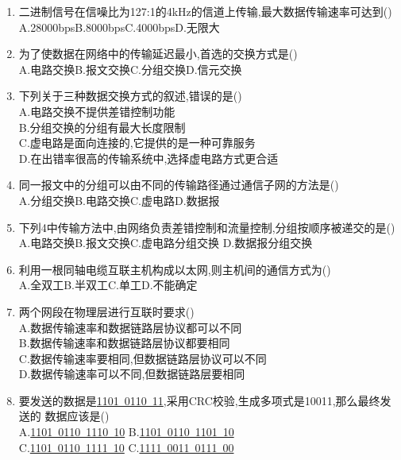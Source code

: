 \documentclass[12pt, a4paper, oneside, UTF8]{ctexbook}
\begin{document}
\begin{enumerate}
    \item \bl[1] 二进制信号在信噪比为127:1的4kHz的信道上传输,最大数据传输速率可达到() \\
    A.28000bps\qquad B.8000bps\qquad C.4000bps\qquad D.无限大

    \item 为了使数据在网络中的传输延迟最小,首选的交换方式是() \\
    A.电路交换\qquad B.报文交换\qquad C.分组交换\qquad D.信元交换 
    
    \item 下列关于三种数据交换方式的叙述,错误的是() \\
    A.电路交换不提供差错控制功能 \\
    B.分组交换的分组有最大长度限制 \\
    C.虚电路是面向连接的,它提供的是一种可靠服务 \\
    D.在出错率很高的传输系统中,选择虚电路方式更合适 

    \item 同一报文中的分组可以由不同的传输路径通过通信子网的方法是()  \\
    A.分组交换\qquad B.电路交换\qquad C.虚电路\qquad D.数据报

    \item 下列4中传输方法中,由网络负责差错控制和流量控制,分组按顺序被递交的是() \\
    A.电路交换\qquad B.报文交换\qquad C.虚电路分组交换 \qquad D.数据报分组交换 

    \item 利用一根同轴电缆互联主机构成以太网,则主机间的通信方式为() \\
    A.全双工\qquad B.半双工\qquad C.单工\qquad D.不能确定

    \item 两个网段在物理层进行互联时要求() \\
    A.数据传输速率和数据链路层协议都可以不同 \\
    B.数据传输速率和数据链路层协议都要相同 \\
    C.数据传输速率要相同,但数据链路层协议可以不同 \\
    D.数据传输速率可以不同,但数据链路层要相同

    \item \bl[2] 要发送的数据是\underline{1101\ 0110\ 11},采用CRC校验,生成多项式是10011,那么最终发送的
    数据应该是() \\
    A.\underline{1101\ 0110\ 1110\ 10} \qquad B.\underline{1101\ 0110\ 1101\ 10}  \\
    C.\underline{1101\ 0110\ 1111\ 10} \qquad C.\underline{1111\ 0011\ 0111\ 00}
    



\end{enumerate}
\end{document}

